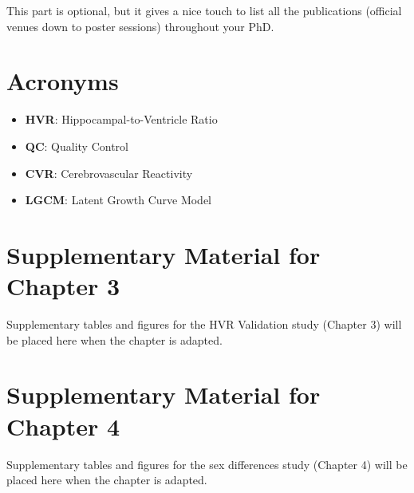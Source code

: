 \documentclass[
  letterpaper,
  12pt,
  oneside]{book}
\providecommand{\tightlist}{%
  \setlength{\itemsep}{0pt}\setlength{\parskip}{0pt}}
\begin{document}

This part is optional, but it gives a nice touch to list all the
publications (official venues down to poster sessions) throughout your
PhD.


\chapter*{Acronyms}\label{acronyms}


\begin{itemize}
\tightlist
\item
  \textbf{HVR}: Hippocampal-to-Ventricle Ratio
\item
  \textbf{QC}: Quality Control
\item
  \textbf{CVR}: Cerebrovascular Reactivity
\item
  \textbf{LGCM}: Latent Growth Curve Model
\end{itemize}

\cleardoublepage
{}
{}
\appendix

\chapter{Supplementary Material for Chapter 3}\label{sec-appendix-ch3}

Supplementary tables and figures for the HVR Validation study (Chapter
3) will be placed here when the chapter is adapted.

\chapter{Supplementary Material for Chapter 4}\label{sec-appendix-ch4}

Supplementary tables and figures for the sex differences study (Chapter
4) will be placed here when the chapter is adapted.


\backmatter
\end{document}
